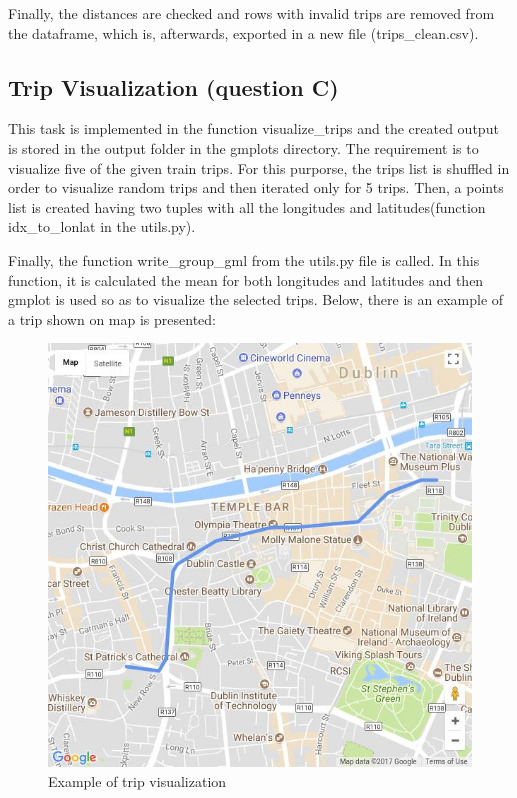 \documentclass[12pt]{article}
\begin{document}
	Finally, the distances are checked and rows with invalid trips are removed from the dataframe, which is, afterwards, exported in a new file (trips\_clean.csv).
	
	\subsection{Trip Visualization (question C)}
	This task is implemented in the function visualize\_trips and the created output is stored in the output folder in the gmplots directory. The requirement is to visualize five of the given train trips. For this purporse, the trips list is shuffled in order to visualize random trips and then iterated only for 5 trips. Then, a points list is created having two tuples with all the longitudes and latitudes(function idx\_to\_lonlat in the utils.py). 
	
	Finally, the function write\_group\_gml from the utils.py file is called. In this function, it is calculated the mean for both longitudes and latitudes and then gmplot is used so as to visualize the selected trips. Below, there is an example of a trip shown on map is presented:
	
	\begin{figure} [H]
		\begin{center}
			\includegraphics [scale = 0.75] {questionCexample.jpg}
			\caption{Example of trip visualization}
		\end{center}
	\end{figure} 
	
\end{document}
